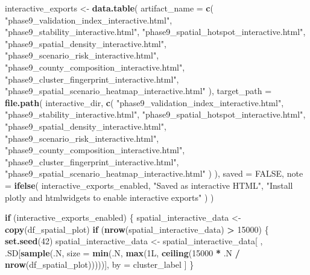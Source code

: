 \documentclass[
]{article}
\newenvironment{Shaded}{\begin{snugshade}}{\end{snugshade}}
\newcommand{\AttributeTok}[1]{\textcolor[rgb]{0.13,0.29,0.53}{#1}}
\newcommand{\ConstantTok}[1]{\textcolor[rgb]{0.56,0.35,0.01}{#1}}
\newcommand{\ControlFlowTok}[1]{\textcolor[rgb]{0.13,0.29,0.53}{\textbf{#1}}}
\newcommand{\DataTypeTok}[1]{\textcolor[rgb]{0.13,0.29,0.53}{#1}}
\newcommand{\DecValTok}[1]{\textcolor[rgb]{0.00,0.00,0.81}{#1}}
\newcommand{\FunctionTok}[1]{\textcolor[rgb]{0.13,0.29,0.53}{\textbf{#1}}}
\newcommand{\NormalTok}[1]{#1}
\newcommand{\OtherTok}[1]{\textcolor[rgb]{0.56,0.35,0.01}{#1}}
\newcommand{\SpecialCharTok}[1]{\textcolor[rgb]{0.81,0.36,0.00}{\textbf{#1}}}
\newcommand{\StringTok}[1]{\textcolor[rgb]{0.31,0.60,0.02}{#1}}
\begin{document}
\begin{Shaded}
\begin{Highlighting}[]
\NormalTok{interactive\_exports }\OtherTok{\textless{}{-}} \FunctionTok{data.table}\NormalTok{(}
  \AttributeTok{artifact\_name =} \FunctionTok{c}\NormalTok{(}
    \StringTok{"phase9\_validation\_index\_interactive.html"}\NormalTok{,}
    \StringTok{"phase9\_stability\_interactive.html"}\NormalTok{,}
    \StringTok{"phase9\_spatial\_hotspot\_interactive.html"}\NormalTok{,}
    \StringTok{"phase9\_spatial\_density\_interactive.html"}\NormalTok{,}
    \StringTok{"phase9\_scenario\_risk\_interactive.html"}\NormalTok{,}
    \StringTok{"phase9\_county\_composition\_interactive.html"}\NormalTok{,}
    \StringTok{"phase9\_cluster\_fingerprint\_interactive.html"}\NormalTok{,}
    \StringTok{"phase9\_spatial\_scenario\_heatmap\_interactive.html"}
\NormalTok{  ),}
  \AttributeTok{target\_path =} \FunctionTok{file.path}\NormalTok{(}
\NormalTok{    interactive\_dir,}
    \FunctionTok{c}\NormalTok{(}
      \StringTok{"phase9\_validation\_index\_interactive.html"}\NormalTok{,}
      \StringTok{"phase9\_stability\_interactive.html"}\NormalTok{,}
      \StringTok{"phase9\_spatial\_hotspot\_interactive.html"}\NormalTok{,}
      \StringTok{"phase9\_spatial\_density\_interactive.html"}\NormalTok{,}
      \StringTok{"phase9\_scenario\_risk\_interactive.html"}\NormalTok{,}
      \StringTok{"phase9\_county\_composition\_interactive.html"}\NormalTok{,}
      \StringTok{"phase9\_cluster\_fingerprint\_interactive.html"}\NormalTok{,}
      \StringTok{"phase9\_spatial\_scenario\_heatmap\_interactive.html"}
\NormalTok{    )}
\NormalTok{  ),}
  \AttributeTok{saved =} \ConstantTok{FALSE}\NormalTok{,}
  \AttributeTok{note =} \FunctionTok{ifelse}\NormalTok{(}
\NormalTok{    interactive\_exports\_enabled,}
    \StringTok{"Saved as interactive HTML"}\NormalTok{,}
    \StringTok{"Install plotly and htmlwidgets to enable interactive exports"}
\NormalTok{  )}
\NormalTok{)}

\ControlFlowTok{if}\NormalTok{ (interactive\_exports\_enabled) \{}
\NormalTok{  spatial\_interactive\_data }\OtherTok{\textless{}{-}} \FunctionTok{copy}\NormalTok{(df\_spatial\_plot)}
  \ControlFlowTok{if}\NormalTok{ (}\FunctionTok{nrow}\NormalTok{(spatial\_interactive\_data) }\SpecialCharTok{\textgreater{}} \DecValTok{15000}\NormalTok{) \{}
    \FunctionTok{set.seed}\NormalTok{(}\DecValTok{42}\NormalTok{)}
\NormalTok{    spatial\_interactive\_data }\OtherTok{\textless{}{-}}\NormalTok{ spatial\_interactive\_data[}
\NormalTok{      ,}
\NormalTok{      .SD[}\FunctionTok{sample}\NormalTok{(.N, }\AttributeTok{size =} \FunctionTok{min}\NormalTok{(.N, }\FunctionTok{max}\NormalTok{(}\DecValTok{1}\DataTypeTok{L}\NormalTok{, }\FunctionTok{ceiling}\NormalTok{(}\DecValTok{15000} \SpecialCharTok{*}\NormalTok{ .N }\SpecialCharTok{/} \FunctionTok{nrow}\NormalTok{(df\_spatial\_plot)))))],}
\NormalTok{      by }\OtherTok{=}\NormalTok{ cluster\_label}
\NormalTok{    ]}
\NormalTok{  \}}


\end{Highlighting}
\end{Shaded}
\end{document}
